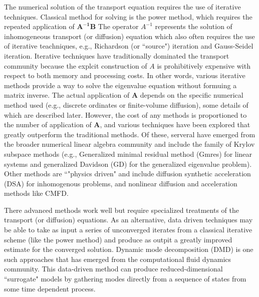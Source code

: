 The numerical solution of the transport equation requires the use of iterative techniques.
Classical method for solving  is the power method, which requires the repeated application of $\mathbf{A^{-1}B}$
The operator $A^{-1}$ represents the solution of inhomogeneous transport (or diffusion) equation which also often requires the use of iterative teachniques, e.g., Richardson (or ``source") iteration and Gauss-Seidel iteration.
Iterative techniques have traditionally dominated the transport community because the explcit construction of $A$ is prohibitively expensive with respect to both memory and processing costs.
In other words, various iterative methods provide a way to solve the eigenvalue equation without formuing a matrix inverse.
The actual application of $\mathbf{A}$ depends on the specific numerical method used (e.g., discrete ordinates or finite-volume diffusion), some details of which are described later. 
However, the cost of any methods is proportioned to the number of application of $\mathbf{A}$, and various techniques have been explored that greatly outperform the traditional methods.
Of these, serveral have emerged from the broader numerical linear algebra community and include the family of Krylov subspace methods (e.g., Generalized minimal residual method (Gmres)\cite{saad1986gmres} for linear systems and generalized Davidson (GD)\cite{hamilton_numerical_2007} for the generalized eigenvalue problem).
Other methods are ``"physics driven" and include diffusion synthetic acceleration (DSA) for inhomogenous problems\cite{Alcouffe_1977,roberts_multigroup_2014}, and nonlinear diffusion and acceleration methods like CMFD\cite{smith_1983}.

There advanced methods work well but require specialized treatments of the transport (or diffusion) equations.
As an alternative, data driven techniques may be able to take as input a series of unconverged iterates from a classical iterative scheme (like the power method) and produce as outpit a greatly improved estimate for the converged solution.
Dynamic mode decomposition (DMD) is one such approaches that has emerged from the computational fluid dynamics community.
This data-driven method can produce reduced-dimensional ``surrogate" models by gathering modes directly from a sequence of states from some time dependent process.


